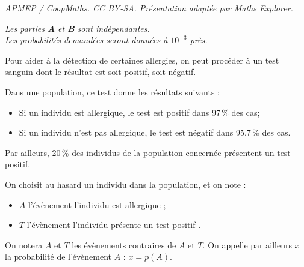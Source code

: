 \documentclass[10pt]{article}
\begin{document}
\noindent\textit{APMEP / CoopMaths. CC BY-SA. Présentation adaptée par Maths Explorer.}\par\medskip
\medskip

\emph{Les parties \textbf{A} et \textbf{B} sont indépendantes.\\
Les probabilités demandées seront données à $10^{-3}$ près.}

Pour aider à la détection de certaines allergies, on peut procéder à un test sanguin dont le résultat est soit positif, soit négatif.

Dans une population, ce test donne les résultats suivants :
\begin{itemize}
\item Si un individu est allergique, le test est positif dans 97\,\% des cas;
\item Si un individu n'est pas allergique, le test est négatif dans 95,7\,\% des cas.
\end{itemize}

Par ailleurs, 20\,\% des individus de la population concernée présentent un test positif.

On choisit au hasard un individu dans la population, et on note :

\begin{itemize}
\item[$\bullet~~$] $A$ l'évènement \og l'individu est allergique \fg{} ;
\item[$\bullet~~$] $T$ l'évènement \og l'individu présente un test positif \fg.
\end{itemize}

On notera $\overline{A}$ et $\overline{T}$ les évènements contraires de $A$ et $T$.
On appelle par ailleurs $x$ la probabilité de l'évènement $A$ : $x = p(A)$.
\end{document}
